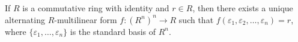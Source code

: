 If $R$ is a commutative ring with identity and $r \in R$, then there exists a unique alternating $R$-multilinear form $f : (R^n)^n \to R$ such that $f(\varepsilon_1, \varepsilon_2, \ldots, \varepsilon_n) = r$, where $\{\varepsilon_1, \ldots, \varepsilon_n\}$ is the standard basis of $R^n$.
